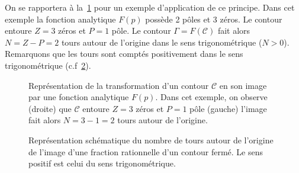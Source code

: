 On se rapportera à la~\cref{fig-contour_cauchy} pour un exemple d'application 
de ce principe. Dans cet exemple la fonction analytique $F(p)$ possède 2 pôles 
et 3 zéros. Le contour entoure $Z=3$ zéros et $P=1$ pôle.
Le contour $\Gamma=F(\mathcal{C})$ fait alors $N=Z-P=2$ tours autour 
de l'origine dans le sens trigonométrique ($N>0$). Remarquons que les tours 
sont comptés positivement dans le sens trigonométrique (c.f~\cref{fig-ntours}).
\begin{figure}[!h]
    \centering
    
    \caption{Représentation de la transformation d'un contour $\mathcal{C}$ 
             en son image par une fonction analytique $F(p)$. Dans cet exemple,
             on observe (droite) que $\mathcal{C}$ entoure $Z=3$ zéros et 
             $P=1$ pôle (gauche) l'image fait alors $N=3-1=2$ tours autour de 
             l'origine.
    \label{fig-contour_cauchy}}
\end{figure}
\begin{figure}[!h]
    \centering
    
    
    

    
    
    
    \caption{Représentation schématique du nombre de tours autour de 
             l'origine de l'image d'une fraction rationnelle d'un contour 
             fermé. Le sens positif est celui du sens trigonométrique.
             \label{fig-ntours}}
\end{figure}
\clearpage
